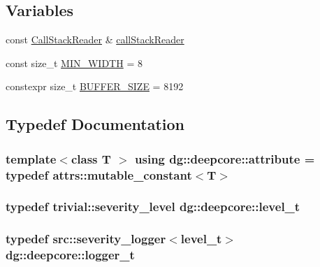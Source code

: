 \subsection*{Variables}
\begin{DoxyCompactItemize}
\item 
const \hyperlink{classdg_1_1deepcore_1_1_call_stack_reader}{Call\+Stack\+Reader} \& \hyperlink{namespacedg_1_1deepcore_afc7f592477ea2eea67265ba8c406e8e7}{call\+Stack\+Reader}
\item 
const size\+\_\+t \hyperlink{namespacedg_1_1deepcore_a5280e55f2875dddfa4400c900d1cef04}{M\+I\+N\+\_\+\+W\+I\+D\+TH} = 8
\item 
constexpr size\+\_\+t \hyperlink{namespacedg_1_1deepcore_ab58b33a87a4d5099cdc3f464eff13f48}{B\+U\+F\+F\+E\+R\+\_\+\+S\+I\+ZE} = 8192
\end{DoxyCompactItemize}


\subsection{Typedef Documentation}
\subsubsection[{\texorpdfstring{attribute}{attribute}}]{\setlength{\rightskip}{0pt plus 5cm}template$<$class T $>$ using {\bf dg\+::deepcore\+::attribute} = typedef attrs\+::mutable\+\_\+constant$<$T$>$}\hypertarget{namespacedg_1_1deepcore_abfee748fb46325389237ecd4d1d7f21b}{}\label{namespacedg_1_1deepcore_abfee748fb46325389237ecd4d1d7f21b}
\subsubsection[{\texorpdfstring{level\+\_\+t}{level_t}}]{\setlength{\rightskip}{0pt plus 5cm}typedef trivial\+::severity\+\_\+level {\bf dg\+::deepcore\+::level\+\_\+t}}\hypertarget{namespacedg_1_1deepcore_ac108b40b3a6b8e3450281eb787e27d6b}{}\label{namespacedg_1_1deepcore_ac108b40b3a6b8e3450281eb787e27d6b}
\subsubsection[{\texorpdfstring{logger\+\_\+t}{logger_t}}]{\setlength{\rightskip}{0pt plus 5cm}typedef src\+::severity\+\_\+logger$<${\bf level\+\_\+t}$>$ {\bf dg\+::deepcore\+::logger\+\_\+t}}\hypertarget{namespacedg_1_1deepcore_acaeda2fb8a475fd1de2ef14ac9ec7a2f}{}\label{namespacedg_1_1deepcore_acaeda2fb8a475fd1de2ef14ac9ec7a2f}


